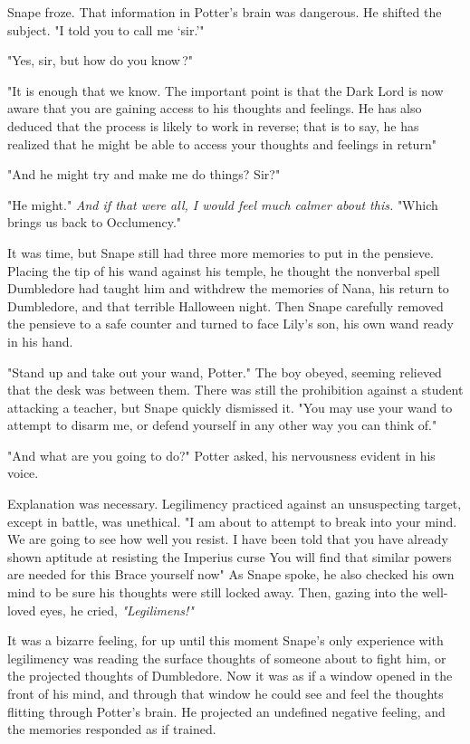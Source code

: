 Snape froze. That information in Potter's brain was dangerous. He shifted the subject. "I told you to call me `sir.'"

"Yes, sir, but how do you know{\el}\,?"

"It is enough that we know. The important point is that the Dark Lord is now aware that you are gaining access to his thoughts and feelings. He has also deduced that the process is likely to work in reverse; that is to say, he has realized that he might be able to access your thoughts and feelings in return{\el}"

"And he might try and make me do things? Sir?"

"He might." \emph{And if that were all, I would feel much calmer about this.} "Which brings us back to Occlumency."

It was time, but Snape still had three more memories to put in the pensieve. Placing the tip of his wand against his temple, he thought the nonverbal spell Dumbledore had taught him and withdrew the memories of Nana, his return to Dumbledore, and that terrible Halloween night. Then Snape carefully removed the pensieve to a safe counter and turned to face Lily's son, his own wand ready in his hand.

"Stand up and take out your wand, Potter." The boy obeyed, seeming relieved that the desk was between them. There was still the prohibition against a student attacking a teacher, but Snape quickly dismissed it. "You may use your wand to attempt to disarm me, or defend yourself in any other way you can think of."

"And what are you going to do?" Potter asked, his nervousness evident in his voice.

Explanation was necessary. Legilimency practiced against an unsuspecting target, except in battle, was unethical. "I am about to attempt to break into your mind. We are going to see how well you resist. I have been told that you have already shown aptitude at resisting the Imperius curse{\el} You will find that similar powers are needed for this{\el} Brace yourself now{\el}" As Snape spoke, he also checked his own mind to be sure his thoughts were still locked away. Then, gazing into the well-loved eyes, he cried, \emph{"Legilimens!"}

It was a bizarre feeling, for up until this moment Snape's only experience with legilimency was reading the surface thoughts of someone about to fight him, or the projected thoughts of Dumbledore. Now it was as if a window opened in the front of his mind, and through that window he could see and feel the thoughts flitting through Potter's brain. He projected an undefined negative feeling, and the memories responded as if trained.

